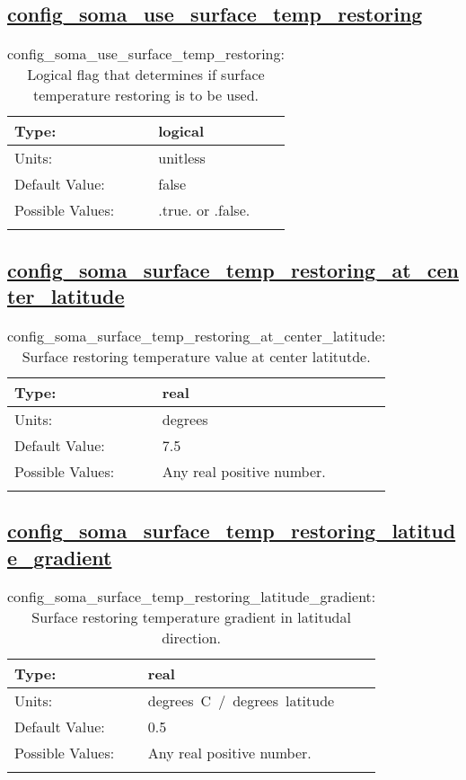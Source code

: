 \subsection[config\_soma\_use\_surface\_temp\_restoring]{\hyperref[sec:nm_tab_soma]{config\_soma\_use\_surface\_temp\_restoring}}
\label{subsec:nm_sec_config_soma_use_surface_temp_restoring}
\begin{center}
\begin{longtable}{| p{2.0in} || p{4.0in} |}
    \hline
    Type: & logical \\
    \hline
    Units: & \si{unitless} \\
    \hline
    Default Value: & false \\
    \hline
    Possible Values: & .true. or .false. \\
    \hline
    \caption{config\_soma\_use\_surface\_temp\_restoring: Logical flag that determines if surface temperature restoring is to be used.}
\end{longtable}
\end{center}
\subsection[config\_soma\_surface\_temp\_restoring\_at\_center\_latitude]{\hyperref[sec:nm_tab_soma]{config\_soma\_surface\_temp\_restoring\_at\_center\_latitude}}
\label{subsec:nm_sec_config_soma_surface_temp_restoring_at_center_latitude}
\begin{center}
\begin{longtable}{| p{2.0in} || p{4.0in} |}
    \hline
    Type: & real \\
    \hline
    Units: & \si{degrees} \\
    \hline
    Default Value: & 7.5 \\
    \hline
    Possible Values: & Any real positive number. \\
    \hline
    \caption{config\_soma\_surface\_temp\_restoring\_at\_center\_latitude: Surface restoring temperature value at center latitutde.}
\end{longtable}
\end{center}
\subsection[config\_soma\_surface\_temp\_restoring\_latitude\_gradient]{\hyperref[sec:nm_tab_soma]{config\_soma\_surface\_temp\_restoring\_latitude\_gradient}}
\label{subsec:nm_sec_config_soma_surface_temp_restoring_latitude_gradient}
\begin{center}
\begin{longtable}{| p{2.0in} || p{4.0in} |}
    \hline
    Type: & real \\
    \hline
    Units: & \si{degrees.C./.degrees.latitude} \\
    \hline
    Default Value: & 0.5 \\
    \hline
    Possible Values: & Any real positive number. \\
    \hline
    \caption{config\_soma\_surface\_temp\_restoring\_latitude\_gradient: Surface restoring temperature gradient in latitudal direction.}
\end{longtable}
\end{center}
